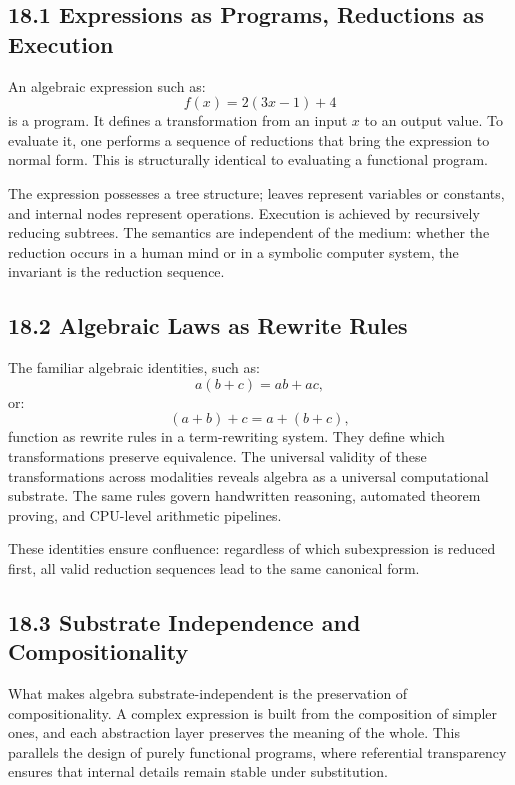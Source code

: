 \documentclass[12pt,letterpaper]{article}
\theoremstyle{remark}
\begin{document}
\subsection{18.1 Expressions as Programs, Reductions as Execution}

An algebraic expression such as:
\[
f(x) = 2(3x - 1) + 4
\]
is a program. It defines a transformation from an input \(x\) to an output value. To evaluate it, one performs a sequence of reductions that bring the expression to normal form. This is structurally identical to evaluating a functional program.

The expression possesses a tree structure; leaves represent variables or constants, and internal nodes represent operations. Execution is achieved by recursively reducing subtrees. The semantics are independent of the medium: whether the reduction occurs in a human mind or in a symbolic computer system, the invariant is the reduction sequence.

\subsection{18.2 Algebraic Laws as Rewrite Rules}

The familiar algebraic identities, such as:
\[
a(b + c) = ab + ac,
\]
or:
\[
(a + b) + c = a + (b + c),
\]
function as rewrite rules in a term-rewriting system. They define which transformations preserve equivalence. The universal validity of these transformations across modalities reveals algebra as a universal computational substrate. The same rules govern handwritten reasoning, automated theorem proving, and CPU-level arithmetic pipelines.

These identities ensure confluence: regardless of which subexpression is reduced first, all valid reduction sequences lead to the same canonical form.

\subsection{18.3 Substrate Independence and Compositionality}

What makes algebra substrate-independent is the preservation of compositionality. A complex expression is built from the composition of simpler ones, and each abstraction layer preserves the meaning of the whole. This parallels the design of purely functional programs, where referential transparency ensures that internal details remain stable under substitution.
\end{document}
